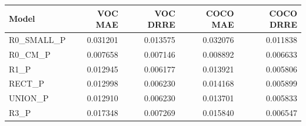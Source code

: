\begin{center}
\begin{minipage}{\linewidth}
\centering
\small
\setlength{\tabcolsep}{4pt}
\label{tab:fidelity}
\begin{tabular}{lrrrr}
\toprule
Model & VOC MAE & VOC DRRE & COCO MAE & COCO DRRE \\
\midrule
R0\_SMALL\_P & 0.031201 & 0.013575 & 0.032076 & 0.011838 \\
R0\_CM\_P & 0.007658 & 0.007146 & 0.008892 & 0.006633 \\
R1\_P & 0.012945 & 0.006177 & 0.013921 & 0.005806 \\
RECT\_P & 0.012998 & 0.006230 & 0.014168 & 0.005899 \\
UNION\_P & 0.012910 & 0.006230 & 0.013701 & 0.005833 \\
R3\_P & 0.017348 & 0.007269 & 0.015840 & 0.006547 \\
\bottomrule
\end{tabular}
\end{minipage}
\end{center}

